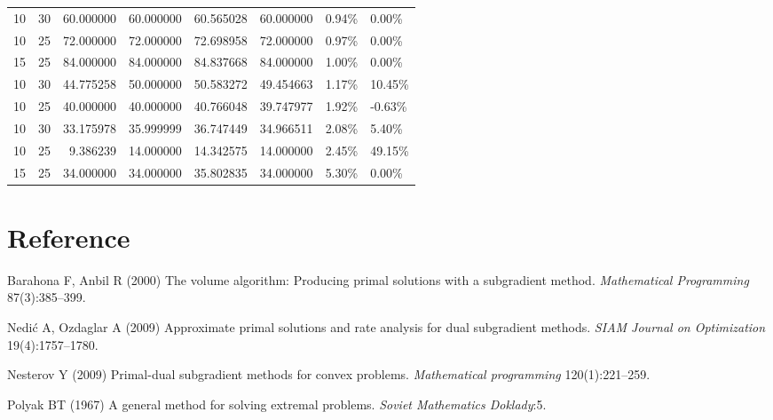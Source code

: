 \documentclass[
  a4paper,
,tablecaptionabove
]{scrartcl}
\numberwithin{equation}{section}
\newlength{\cslhangindent}
\newenvironment{cslreferences}%
  {\setlength{\parindent}{0pt}%
  \everypar{\setlength{\hangindent}{\cslhangindent}}\ignorespaces}%
  {\par}
\begin{document}
\begin{table}
\begin{tabular}{|l|l|r|r|r|r|l|l|}
 10 &  30 &   60.000000 &   60.000000 &    60.565028 &   60.000000 &      0.94\% &     0.00\% \\
 10 &  25 &   72.000000 &   72.000000 &    72.698958 &   72.000000 &      0.97\% &     0.00\% \\
 15 &  25 &   84.000000 &   84.000000 &    84.837668 &   84.000000 &      1.00\% &     0.00\% \\
 10 &  30 &   44.775258 &   50.000000 &    50.583272 &   49.454663 &      1.17\% &    10.45\% \\
 10 &  25 &   40.000000 &   40.000000 &    40.766048 &   39.747977 &      1.92\% &    -0.63\% \\
 10 &  30 &   33.175978 &   35.999999 &    36.747449 &   34.966511 &      2.08\% &     5.40\% \\
 10 &  25 &    9.386239 &   14.000000 &    14.342575 &   14.000000 &      2.45\% &    49.15\% \\
 15 &  25 &   34.000000 &   34.000000 &    35.802835 &   34.000000 &      5.30\% &     0.00\% \\
\bottomrule
\end{tabular}
\small 
\end{table}

\hypertarget{reference}{%
\section*{Reference}\label{reference}}

\hypertarget{refs}{}
\begin{cslreferences}
\leavevmode\hypertarget{ref-barahona_volume_2000}{}%
Barahona F, Anbil R (2000) The volume algorithm: Producing primal
solutions with a subgradient method. \emph{Mathematical Programming}
87(3):385--399.

\leavevmode\hypertarget{ref-nedic_approximate_2009}{}%
Nedić A, Ozdaglar A (2009) Approximate primal solutions and rate
analysis for dual subgradient methods. \emph{SIAM Journal on
Optimization} 19(4):1757--1780.

\leavevmode\hypertarget{ref-nesterov_primal-dual_2009}{}%
Nesterov Y (2009) Primal-dual subgradient methods for convex problems.
\emph{Mathematical programming} 120(1):221--259.

\leavevmode\hypertarget{ref-polyak_general_nodate}{}%
Polyak BT (1967) A general method for solving extremal problems.
\emph{Soviet Mathematics Doklady}:5.
\end{cslreferences}
\end{document}
